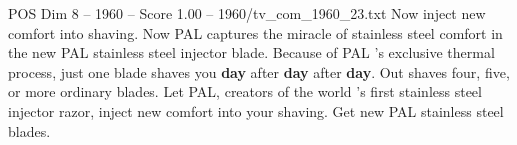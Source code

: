 \begin{textsample}{POS Dim 8 – 1960 – Score 1.00 – 1960/tv\_com\_1960\_23.txt}  \label{ex:f8_pos_065}
Now inject new comfort into shaving.
Now PAL captures the miracle of stainless steel comfort in the new PAL stainless steel injector blade.
Because of PAL 's exclusive thermal process, just one blade shaves you \textbf{day} after \textbf{day} after \textbf{day}.
Out shaves four, five, or more ordinary blades.
Let PAL, creators of the world 's first stainless steel injector razor, inject new comfort into your shaving.
Get new PAL stainless steel blades.

\end{textsample}
